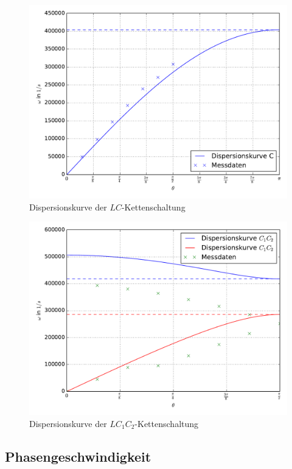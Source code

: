 \begin{figure}
  \includegraphics[width=\textwidth]{Dispersionskurve_C.pdf}
  \caption{Dispersionskurve der $LC$-Kettenschaltung}
  \label{fig:DispersionC}
\end{figure}
\begin{figure}
  \includegraphics[width=\textwidth]{Dispersionskurve_C1C2.pdf}
  \caption{Dispersionskurve der $LC_1C_2$-Kettenschaltung}
  \label{fig:DispersionC1C2}
\end{figure}
\FloatBarrier

\subsection{Phasengeschwindigkeit}

